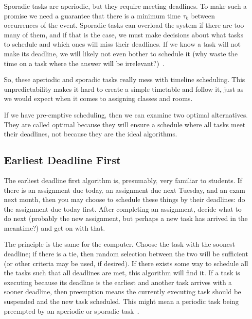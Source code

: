 Sporadic tasks are aperiodic, but they require meeting deadlines. To make such a promise we need a guarantee that there is a minimum time $\tau_{k}$ between occurrences of the event. Sporadic tasks can overload the system if there are too many of them, and if that is the case, we must make decisions about what tasks to schedule and which ones will miss their deadlines. If we know a task will not make its deadline, we will likely not even bother to schedule it (why waste the time on a task where the answer will be irrelevant?)~\cite{mte241}.

So, these aperiodic and sporadic tasks really mess with timeline scheduling. This unpredictability makes it hard to create a simple timetable and follow it, just as we would expect when it comes to assigning classes and rooms. 

If we have pre-emptive scheduling, then we can examine two optimal alternatives. They are called optimal because they will ensure a schedule where all tasks meet their deadlines, not because they are the ideal algorithms.

\subsection*{Earliest Deadline First}

The earliest deadline first algorithm is, presumably, very familiar to students. If there is an assignment due today, an assignment due next Tuesday, and an exam next month, then you may choose to schedule these things by their deadlines: do the assignment due today first. After completing an assignment, decide what to do next (probably the new assignment, but perhaps a new task has arrived in the meantime?) and get on with that.

The principle is the same for the computer. Choose the task with the soonest deadline; if there is a tie, then random selection between the two will be sufficient (or other criteria may be used, if desired). If there exists some way to schedule all the tasks such that all deadlines are met, this algorithm will find it. If a task is executing because its deadline is the earliest and another task arrives with a sooner deadline, then preemption means the currently executing task should be suspended and the new task scheduled. This might mean a periodic task being preempted by an aperiodic or sporadic task~\cite{mte241}.

